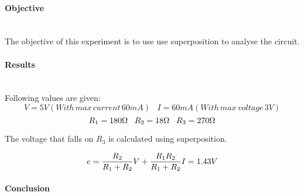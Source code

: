 \paragraph*{Objective} \hfill \\
The objective of this experiment is to use use superposition to analyse the circuit. 

\paragraph*{Results} \hfill \\
Following values are given:
\begin{equation}
V=5V (With\,max\,current\,60mA) \,\,\,\,\,  I=60mA (With\,max\,voltage\,3V)  
\end{equation}
\begin{equation}
R_{1}=180\Omega \,\,\,\,\, R_{2}=18\Omega \,\,\,\,\, R_{3}=270\Omega \\
\end{equation}

The voltage that falls on $R_{3}$ is calculated using superposition.

\begin{equation}
e= \frac{R_{2}}{R_{1}+R_{2}}V+ \frac{R_{1}R_{2}}{R_{1}+R_{2}}I = 1.43V \\
\end{equation}

\paragraph*{Conclusion} \hfill \\

